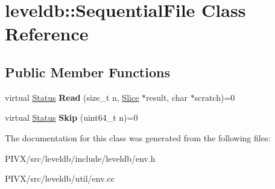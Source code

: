 \hypertarget{classleveldb_1_1_sequential_file}{}\section{leveldb\+:\+:Sequential\+File Class Reference}
\label{classleveldb_1_1_sequential_file}
\subsection*{Public Member Functions}
\begin{DoxyCompactItemize}
\item 
\mbox{\label{classleveldb_1_1_sequential_file_a4136bef1546cdb9fbbd477a635460261}} 
virtual \mbox{\hyperlink{classleveldb_1_1_status}{Status}} {\bfseries Read} (size\+\_\+t n, \mbox{\hyperlink{classleveldb_1_1_slice}{Slice}} $\ast$result, char $\ast$scratch)=0
\item 
\mbox{\label{classleveldb_1_1_sequential_file_a18c94279fc058cad4d03cdfe04b12179}} 
virtual \mbox{\hyperlink{classleveldb_1_1_status}{Status}} {\bfseries Skip} (uint64\+\_\+t n)=0
\end{DoxyCompactItemize}


The documentation for this class was generated from the following files\+:\begin{DoxyCompactItemize}
\item 
P\+I\+V\+X/src/leveldb/include/leveldb/env.\+h\item 
P\+I\+V\+X/src/leveldb/util/env.\+cc\end{DoxyCompactItemize}
